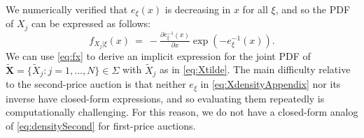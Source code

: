 We numerically verified that $e_{\xi }( x) $ is decreasing in $x$ for all $\xi $, and so the PDF of $X_j$ can be expressed as follows: 
\begin{equation}
f_{X_j|\xi }(x)~=~-\tfrac{\partial e_{\xi }^{-1}( x) }{\partial x}\exp ( -e_{\xi }^{-1}( x) ) . \label{eq:fx}
\end{equation}
We can use \eqref{eq:fx} to derive an implicit expression for the joint PDF of $\mathbf{\tilde{X}}=\{\tilde{X}_{j}:j=1,\dots ,N\}\in \Sigma $ with $\tilde{X}_{j}$ as in \eqref{eq:Xtilde}. The main difficulty relative to the second-price auction is that neither $ e_{\xi }$ in \eqref{eq:XdensityAppendix} nor its inverse have closed-form expressions, and so evaluating them repeatedly is computationally challenging. For this reason, we do not have a closed-form analog of \eqref{eq:densitySecond} for first-price auctions.

